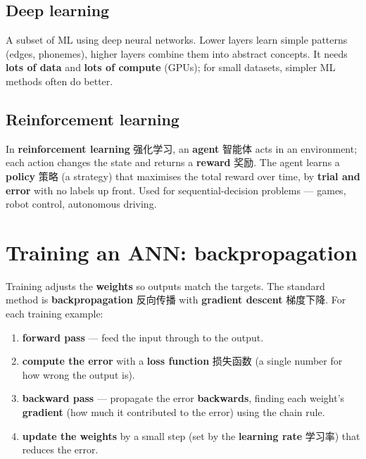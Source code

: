 \documentclass[11pt]{article}
\begin{document}
\subsection*{Deep learning}

A subset of ML using deep neural networks. Lower layers learn simple patterns (edges, phonemes), higher layers combine them into abstract concepts. It needs \textbf{lots of data} and \textbf{lots of compute} (GPUs); for small datasets, simpler ML methods often do better.

\subsection*{Reinforcement learning}

In \textbf{reinforcement learning} 强化学习, an \textbf{agent} 智能体 acts in an environment; each action changes the state and returns a \textbf{reward} 奖励. The agent learns a \textbf{policy} 策略 (a strategy) that maximises the total reward over time, by \textbf{trial and error} with no labels up front. Used for sequential-decision problems — games, robot control, autonomous driving.

\section*{Training an ANN: backpropagation}

Training adjusts the \textbf{weights} so outputs match the targets. The standard method is \textbf{backpropagation} 反向传播 with \textbf{gradient descent} 梯度下降. For each training example:

\begin{enumerate}
\item \textbf{forward pass} — feed the input through to the output.

\item \textbf{compute the error} with a \textbf{loss function} 损失函数 (a single number for how wrong the output is).

\item \textbf{backward pass} — propagate the error \textbf{backwards}, finding each weight's \textbf{gradient} (how much it contributed to the error) using the chain rule.

\item \textbf{update the weights} by a small step (set by the \textbf{learning rate} 学习率) that reduces the error.

\end{enumerate}
\end{document}
